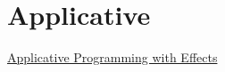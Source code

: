 \chapter{Applicative}

\href{http://www.staff.city.ac.uk/~ross/papers/Applicative.html}{Applicative Programming with Effects}